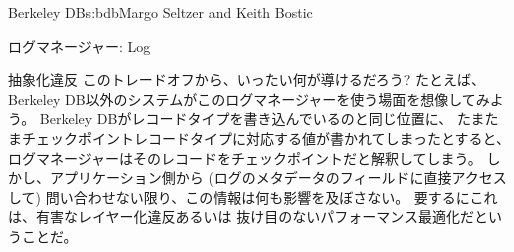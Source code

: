 \begin{aosachapter}{Berkeley DB}{s:bdb}{Margo Seltzer and Keith Bostic}
\begin{aosasect1}{ログマネージャー: Log}
\begin{aosasect2}{抽象化違反}
このトレードオフから、いったい何が導けるだろう?
たとえば、Berkeley DB以外のシステムがこのログマネージャーを使う場面を想像してみよう。
Berkeley DBがレコードタイプを書き込んでいるのと同じ位置に、
たまたまチェックポイントレコードタイプに対応する値が書かれてしまったとすると、
ログマネージャーはそのレコードをチェックポイントだと解釈してしまう。
しかし、アプリケーション側から
(ログのメタデータのフィールドに直接アクセスして)
問い合わせない限り、この情報は何も影響を及ぼさない。
要するにこれは、有害なレイヤー化違反あるいは
抜け目のないパフォーマンス最適化だということだ。


\end{aosasect2}
\end{aosasect1}
\end{aosachapter}

